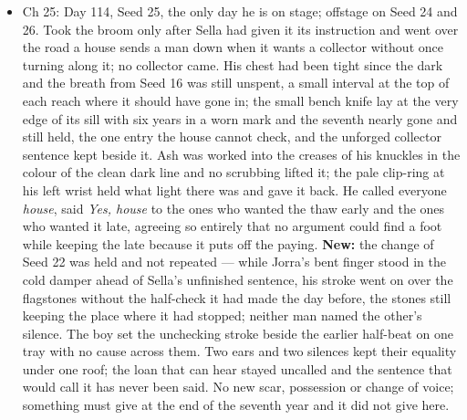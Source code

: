 \documentclass{design/chronicle}
\begin{document}
{\begin{itemize}[leftmargin=1.4em,itemsep=1pt,topsep=3pt,parsep=0pt]
\item Ch 25: Day 114, Seed 25, the only day he is on stage; offstage on Seed 24 and 26. Took the broom only after Sella had given it its instruction and went over the road a house sends a man down when it wants a collector without once turning along it; no collector came. His chest had been tight since the dark and the breath from Seed 16 was still unspent, a small interval at the top of each reach where it should have gone in; the small bench knife lay at the very edge of its sill with six years in a worn mark and the seventh nearly gone and still held, the one entry the house cannot check, and the unforged collector sentence kept beside it. Ash was worked into the creases of his knuckles in the colour of the clean dark line and no scrubbing lifted it; the pale clip-ring at his left wrist held what light there was and gave it back. He called everyone \emph{house}, said \emph{Yes, house} to the ones who wanted the thaw early and the ones who wanted it late, agreeing so entirely that no argument could find a foot while keeping the late because it puts off the paying. \textbf{New:} the change of Seed 22 was held and not repeated — while Jorra’s bent finger stood in the cold damper ahead of Sella’s unfinished sentence, his stroke went on over the flagstones without the half-check it had made the day before, the stones still keeping the place where it had stopped; neither man named the other’s silence. The boy set the unchecking stroke beside the earlier half-beat on one tray with no cause across them. Two ears and two silences kept their equality under one roof; the loan that can hear stayed uncalled and the sentence that would call it has never been said. No new scar, possession or change of voice; something must give at the end of the seventh year and it did not give here.

\end{itemize}

\begin{itemize}[leftmargin=1.4em,itemsep=1pt,topsep=3pt,parsep=0pt]


\end{itemize}}
\end{document}
